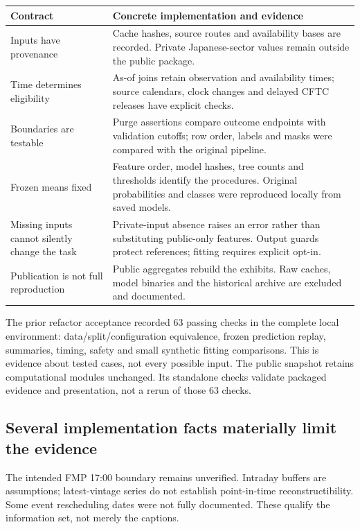\documentclass[11pt,a4paper]{article}
\begin{document}
\begingroup\small
\begin{tabular}{@{}>{\raggedright\arraybackslash}p{.25\linewidth}>{\raggedright\arraybackslash}p{.70\linewidth}@{}}\toprule
Contract & Concrete implementation and evidence\\\midrule
Inputs have provenance & Cache hashes, source routes and availability bases are recorded. Private Japanese-sector values remain outside the public package.\\
Time determines eligibility & As-of joins retain observation and availability times; source calendars, clock changes and delayed CFTC releases have explicit checks.\\
Boundaries are testable & Purge assertions compare outcome endpoints with validation cutoffs; row order, labels and masks were compared with the original pipeline.\\
Frozen means fixed & Feature order, model hashes, tree counts and thresholds identify the procedures. Original probabilities and classes were reproduced locally from saved models.\\
Missing inputs cannot silently change the task & Private-input absence raises an error rather than substituting public-only features. Output guards protect references; fitting requires explicit opt-in.\\
Publication is not full reproduction & Public aggregates rebuild the exhibits. Raw caches, model binaries and the historical archive are excluded and documented.\\\bottomrule
\end{tabular}\endgroup

The prior refactor acceptance recorded 63 passing checks in the complete local environment: data/split/configuration equivalence, frozen prediction replay, summaries, timing, safety and small synthetic fitting comparisons. This is evidence about tested cases, not every possible input. The public snapshot retains computational modules unchanged. Its standalone checks validate packaged evidence and presentation, not a rerun of those 63 checks.

\subsection*{Several implementation facts materially limit the evidence}
The intended FMP 17:00 boundary remains unverified. Intraday buffers are assumptions; latest-vintage series do not establish point-in-time reconstructibility. Some event rescheduling dates were not fully documented. These qualify the information set, not merely the captions.
\end{document}
